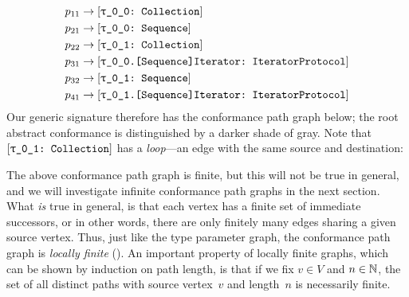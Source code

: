 \documentclass[../generics]{subfiles}
\begin{document}
\begin{example}
\begin{align*}
p_{11}&\rightarrow\ConfReq{\rT}{Collection}\\
p_{21}&\rightarrow\ConfReq{\rT}{Sequence}\\
p_{22}&\rightarrow\ConfReq{\rU}{Collection}\\
p_{31}&\rightarrow\ConfReq{\rT.[Sequence]Iterator}{IteratorProtocol}\\
p_{32}&\rightarrow\ConfReq{\rU}{Sequence}\\
p_{41}&\rightarrow\ConfReq{\rU.[Sequence]Iterator}{IteratorProtocol}
\end{align*}
Our generic signature therefore has the conformance path graph below; the root abstract conformance is distinguished by a darker shade of gray. Note that $\ConfReq{\rU}{Collection}$ has a \emph{loop}---an edge with the same source and destination:

\begin{center}
\end{center}
\end{example}

The above conformance path graph is finite, but this will not be true in general, and we will investigate infinite conformance path graphs in the next section. What \emph{is} true in general, is that each vertex has a finite set of immediate successors, or in other words, there are only finitely many edges sharing a given source vertex. Thus, just like the type parameter graph, the conformance path graph is \emph{locally finite} (). An important property of locally finite graphs, which can be shown by induction on path length, is that if we fix $v\in V$ and $n\in\mathbb{N}$, the set of all distinct paths with source vertex~$v$ and length~$n$ is necessarily finite.
\end{document}
